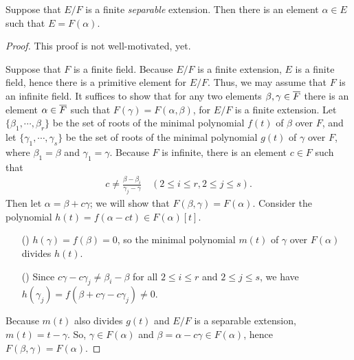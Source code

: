 \begin{thm}\label{primitive element theorem}
    Suppose that $E/F$ is a finite \textit{separable} extension.
    Then there is an element $\alpha\in E$ such that $E=F(\alpha)$.
\end{thm}
\begin{proof}
    \color{teal}This proof is not well-motivated, yet.\color{black}

    Suppose that $F$ is a finite field.
    Because $E/F$ is a finite extension, $E$ is a finite field, hence there is a primitive element for $E/F$.
    Thus, we may assume that $F$ is an infinite field.
    It suffices to show that for any two elements $\beta, \gamma\in \overline{F}$ there is an element $\alpha\in \overline{F}$ such that $F(\gamma)=F(\alpha, \beta)$, for $E/F$ is a finite extension.
    Let $\{\beta_1, \cdots, \beta_r\}$ be the set of roots of the minimal polynomial $f(t)$ of $\beta$ over $F$, and let $\{\gamma_1, \cdots, \gamma_s\}$ be the set of roots of the minimal polynomial $g(t)$ of $\gamma$ over $F$, where $\beta_1=\beta$ and $\gamma_1=\gamma$.
    Because $F$ is infinite, there is an element $c\in F$ such that
    \begin{align*}
        c\neq\frac{\beta-\beta_i}{\gamma_j-\gamma}\quad(2\leq i\leq r, 2\leq j\leq s).
    \end{align*}
    Then let $\alpha=\beta+c\gamma$; we will show that $F(\beta, \gamma)=F(\alpha)$.
    Consider the polynomial $h(t)=f(\alpha-ct)\in F(\alpha)[t]$.
    \begin{enumerate}
        \item[(\romannumeral 1)]
        {
            $h(\gamma)=f(\beta)=0$, so the minimal polynomial $m(t)$ of $\gamma$ over $F(\alpha)$ divides $h(t)$.
        }
        \item[(\romannumeral 2)]
        {
            Since $c\gamma-c\gamma_j\neq\beta_i-\beta$ for all $2\leq i\leq r$ and $2\leq j\leq s$, we have $h(\gamma_j)=f(\beta+c\gamma-c\gamma_j)\neq 0$.
        }
    \end{enumerate}
    Because $m(t)$ also divides $g(t)$ and $E/F$ is a separable extension, $m(t)=t-\gamma$.
    So, $\gamma\in F(\alpha)$ and $\beta=\alpha-c\gamma\in F(\alpha)$, hence $F(\beta, \gamma)=F(\alpha)$.
\end{proof}